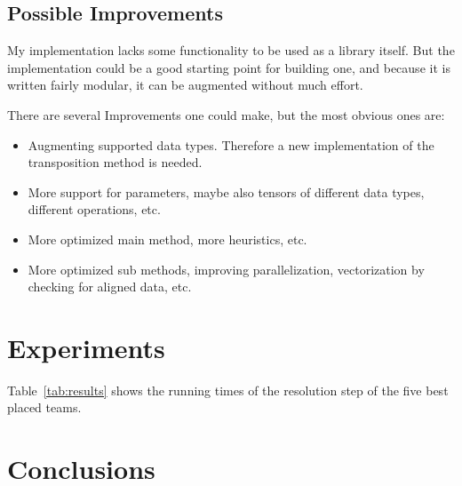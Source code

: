 \documentclass[sigconf]{acmart}
\begin{document}
\subsection{Possible Improvements}
My implementation lacks some functionality to be used as a library itself. But the implementation could be a good starting point for building one, and because it is written fairly modular, it can be augmented without much effort.

There are several Improvements one could make, but the most obvious ones are:
\begin{itemize}
  \item Augmenting supported data types. Therefore a new implementation of the transposition method is needed.
  \item More support for parameters, maybe also tensors of different data types, different operations, etc.
  \item More optimized main method, more heuristics, etc.
  \item More optimized sub methods, improving parallelization, vectorization by checking for aligned data, etc.
\end{itemize}

\section{Experiments}
\label{sec:experiments}

Table~\ref{tab:results} shows the running times of the resolution step of the five best placed teams.


\begin{table}[htbp]
  \caption{Comparison of the F-measure and the running times of the resolution step of the five best placed teams. The input data for the resolution step consisted of 29{,}787 in JSON formatted e-commerce websites. Measurements were taken on a
laptop running Ubuntu 19.04 with 16 GB of RAM and two Intel Core i5-4310U CPUs. The underlying SSD was a 500\,GB 860 EVO mSATA. We cleared the page cache, dentries, and inodes before each run to avoid reading the input data from RAM instead of the SSD.}
  \label{tab:results}
\end{table}


\section{Conclusions}
\label{sec:conclusions}



\end{document}
